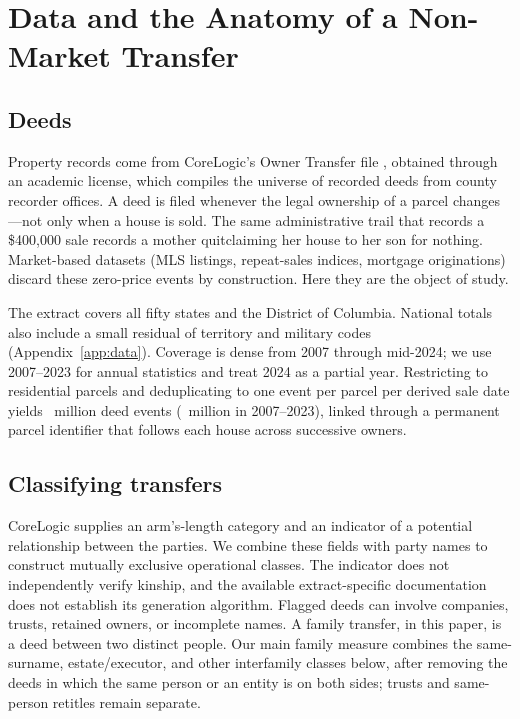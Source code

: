 \section{Data and the Anatomy of a Non-Market Transfer}\label{sec:data}

\subsection{Deeds}

Property records come from CoreLogic's Owner Transfer file
\citep{corelogic_data}, obtained through an academic license, which compiles
the universe of recorded deeds from county recorder offices. A deed is filed
whenever the legal ownership of a parcel changes---not only when a house is
sold. The same administrative trail that records a \$400,000 sale records a
mother quitclaiming her house to her son for nothing. Market-based datasets
(MLS listings, repeat-sales indices, mortgage originations) discard these
zero-price events by construction. Here they are the object of study.

The extract covers all fifty states and the District of Columbia. National
totals also include a small residual of territory and military codes
(Appendix~\ref{app:data}). Coverage
is dense from 2007 through mid-2024; we use 2007--2023 for annual statistics
and treat 2024 as a partial year. Restricting to residential parcels and
deduplicating to one event per parcel per derived sale date yields \SIIIEventsAllM\ million
deed events (\SIIIEventsSampleM\ million in 2007--2023), linked through a permanent parcel
identifier that follows each house across successive owners.

\subsection{Classifying transfers}

CoreLogic supplies an arm's-length category and an indicator of a potential relationship between the parties. We combine these fields with party names to construct mutually exclusive operational classes. The indicator does not independently verify kinship, and the available extract-specific documentation does not establish its generation algorithm. Flagged deeds can involve companies, trusts, retained owners, or incomplete names. A family transfer, in this paper, is a deed between two distinct people. Our main family measure combines the same-surname, estate/executor, and other interfamily classes below, after removing the deeds in which the same person or an entity is on both sides; trusts and same-person retitles remain separate.

